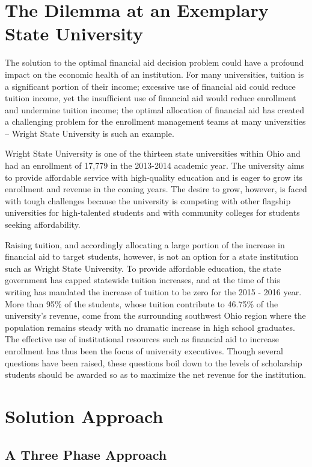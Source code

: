 \documentclass[12pt,english]{report}
\begin{document}
\section{The Dilemma at an Exemplary State University}
The solution to the optimal financial aid decision problem could have a
profound impact on the economic health of an institution.  For many
universities, tuition is a significant portion of their income; excessive use
of financial aid  could reduce tuition income, yet the insufficient use of
financial aid would reduce enrollment and undermine tuition income; the optimal
allocation of financial aid has created a challenging problem for the
enrollment management teams at many universities -- Wright State University is
such an example.

Wright State University is one of the thirteen state universities within Ohio
and had an enrollment of 17,779  in the 2013-2014 academic year. The university
aims to provide affordable service with high-quality education and is eager to
grow its enrollment and revenue in the coming years.  The desire to grow,
however, is faced with tough challenges because the university is competing
with other flagship universities for high-talented students and with community
colleges for students seeking affordability.

Raising tuition, and accordingly allocating a large portion of the increase in
financial aid to target students, however, is not an option for a state
institution such as Wright State University. To provide affordable education,
the state government has capped statewide tuition increases, and at the time of
this writing has mandated the increase of tuition to be zero for the 2015 -
2016 year. More than 95\% of the students, whose tuition contribute to 46.75\%
of the university's revenue, come from the surrounding southwest Ohio region
where the population remains steady with no dramatic increase in high school
graduates. The effective use of institutional resources such as financial aid
to increase enrollment has thus been the focus of university executives.
Though several questions have been raised, these questions boil down to the
levels of scholarship students should be awarded so as to maximize the net
revenue for the institution.


\section{Solution Approach}
\subsection{A Three Phase Approach}
\end{document}
